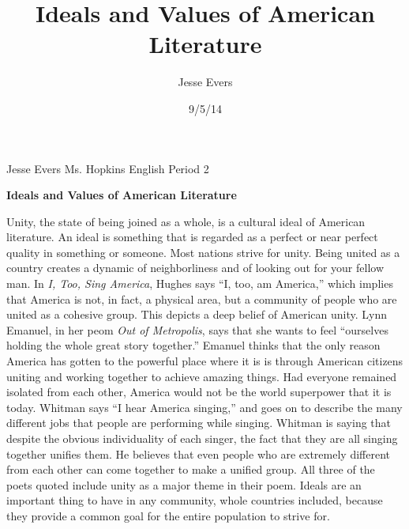 \documentclass[12pt,twoside]{article}
\title{Ideals and Values of American Literature}
\author{Jesse Evers}
\date{9/5/14}
\begin{document}
\noindent Jesse Evers\newline
Ms. Hopkins\newline
English\newline
Period 2\newline
\centerline{\textbf{Ideals and Values of American Literature}}

\indent Unity, the state of being joined as a whole, is a cultural ideal of American literature. An ideal is something that is regarded as a perfect or near perfect quality in something or someone. Most nations strive for unity. Being united as a country creates a dynamic of neighborliness and of looking out for your fellow man. In \textit{I, Too, Sing America}, Hughes says ``I, too, am America,'' which implies that America is not, in fact, a physical area, but a community of people who are united as a cohesive group. This depicts a deep belief of American unity. Lynn Emanuel, in her peom \textit{Out of Metropolis}, says that she wants to feel ``ourselves holding the whole great story together.'' Emanuel thinks that the only reason America has gotten to the powerful place where it is is through American citizens uniting and working together to achieve amazing things. Had everyone remained isolated from each other, America would not be the world superpower that it is today. Whitman says ``I hear America singing,'' and goes on to describe the many different jobs that people are performing while singing. Whitman is saying that despite the obvious individuality of each singer, the fact that they are all singing together unifies them. He believes that even people who are extremely different from each other can come together to make a unified group. All three of the poets quoted include unity as a major theme in their poem. Ideals are an important thing to have in any community, whole countries included, because they provide a common goal for the entire population to strive for.
\end{document}
